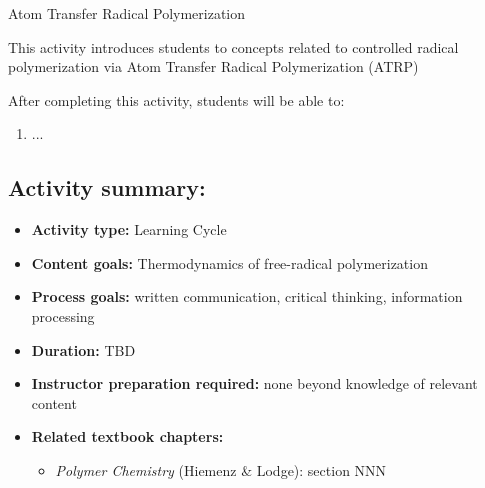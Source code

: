 %
%
%
%

\renewcommand{\figpath}{content/polymchem/livingpolyms/ATRP/figs}
\renewcommand{\labelbase}{ATRP}

\begin{activity}{Atom Transfer Radical Polymerization}

\begin{instructornotes}
	This activity introduces students to concepts related to controlled radical polymerization via Atom Transfer Radical Polymerization (ATRP)
	
	After completing this activity, students will be able to:
	\begin{enumerate}
		\item ...
	\end{enumerate}
	
	\subsection*{Activity summary:}
	\begin{itemize}
		\item \textbf{Activity type:} Learning Cycle
		\item \textbf{Content goals:} Thermodynamics of free-radical polymerization
		\item \textbf{Process goals:} %
			written communication, critical thinking, information processing
		\item \textbf{Duration:} TBD
		\item \textbf{Instructor preparation required:} none beyond knowledge of relevant content
		\item \textbf{Related textbook chapters:}
			\begin{itemize}
				\item \emph{Polymer Chemistry} (Hiemenz \& Lodge): section NNN
			\end{itemize}
	\end{itemize}
	

\end{instructornotes}
\end{activity}
